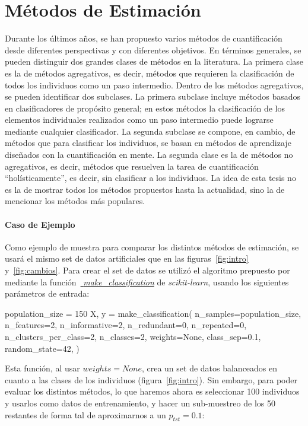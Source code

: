 \chapter{Métodos de Estimación}\label{estimacion}

Durante los últimos años, se han propuesto varios métodos de cuantificación
desde diferentes perspectivas y con diferentes objetivos. En términos generales,
se pueden distinguir dos grandes clases de métodos en la literatura. La primera
clase es la de métodos agregativos, es decir, métodos que requieren la
clasificación de todos los individuos como un paso intermedio. Dentro de los
métodos agregativos, se pueden identificar dos subclases. La primera subclase
incluye métodos basados en clasificadores de propósito general; en estos métodos
la clasificación de los elementos individuales realizados como un paso
intermedio puede lograrse mediante cualquier clasificador. La segunda subclase
se compone, en cambio, de métodos que para clasificar los individuos, se basan
en métodos de aprendizaje diseñados con la cuantificación en mente. La segunda
clase es la de métodos no agregativos, es decir, métodos que resuelven la tarea
de cuantificación “holísticamente”, es decir, sin clasificar a los individuos.
La idea de esta tesis no es la de mostrar todos los métodos propuestos hasta la
actualidad, sino la de mencionar los métodos más populares.

\subsubsection{Caso de Ejemplo}\label{estimacion:ejemplo}

Como ejemplo de muestra para comparar los distintos métodos de estimación, se
usará el mismo set de datos artificiales que en las figuras~\ref{fig:intro}
y~\ref{fig:cambios}. Para crear el set de datos se utilizó el algoritmo
prepuesto por~\citet{Guyon2003DesignOE} mediante la
función~\href{https://scikit-learn.org/stable/modules/generated/sklearn.datasets.make_classification.html}{{\it
make\_classification}} de {\it scikit-learn}, usando los siguientes parámetros
de entrada:

\begin{python}
population_size = 150 X, y = make_classification( n_samples=population_size,
n_features=2, n_informative=2, n_redundant=0, n_repeated=0,
n_clusters_per_class=2, n_classes=2, weights=None, class_sep=0.1,
random_state=42, )
\end{python}

Esta función, al usar \(weights=None\), crea un set de datos balanceados en
cuanto a las clases de los individuos (figura~\ref{fig:intro}). Sin embargo,
para poder evaluar los distintos métodos, lo que haremos ahora es seleccionar
100 individuos y usarlos como datos de entrenamiento, y hacer un sub-muestreo de
los 50 restantes de forma tal de aproximarnos a un \(p_{tst}=0.1\):

